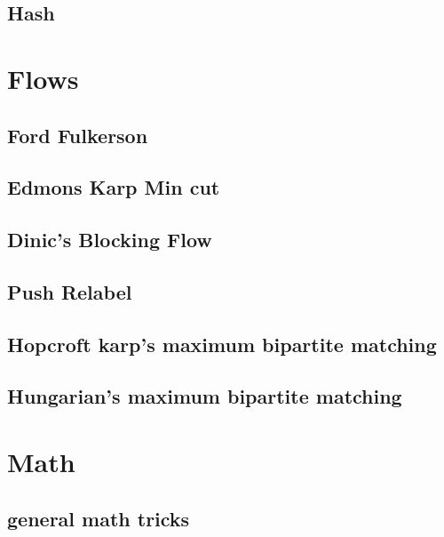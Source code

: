 \subsection{Hash}
\raggedbottom
\hrulefill

\section{Flows}
\subsection{Ford Fulkerson}
\raggedbottom
\hrulefill
\subsection{Edmons Karp Min cut}
\raggedbottom
\hrulefill
\subsection{Dinic's Blocking Flow}
\raggedbottom
\hrulefill
\subsection{Push Relabel}
\raggedbottom
\hrulefill
\subsection{Hopcroft karp's maximum bipartite matching}
\raggedbottom
\hrulefill
\subsection{Hungarian's maximum bipartite matching}
\raggedbottom
\hrulefill

\section{Math}
\subsection{general math tricks}
\raggedbottom
\hrulefill

